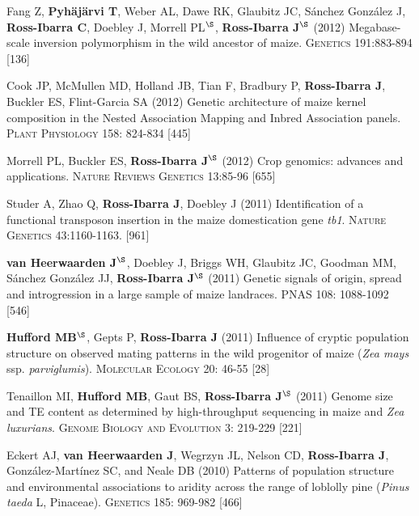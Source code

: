 \documentclass[letterpaper,10pt]{article}
\begin{document}
\begin{etaremune}
\item Fang Z, {\bf Pyh\"aj\"arvi T}, Weber AL, Dawe RK, Glaubitz JC, S\'{a}nchez Gonz\'{a}lez J, {\bf Ross-Ibarra C}, Doebley J, Morrell PL$^\S$, {\bf Ross-Ibarra J}$^\S$  (2012) Megabase-scale inversion polymorphism in the wild ancestor of maize. \textsc{Genetics} 191:883-894
{} [136]\\


\item Cook JP, McMullen MD, Holland JB, Tian F, Bradbury P, {\bf Ross-Ibarra J}, Buckler ES, Flint-Garcia SA (2012) Genetic architecture of maize kernel composition in the Nested Association Mapping and Inbred Association panels. \textsc{Plant Physiology} 158: 824-834
{} [445]\\

\item Morrell PL, Buckler ES, {\bf Ross-Ibarra J}$^\S$ (2012) Crop genomics: advances and applications.  \textsc{Nature Reviews Genetics} 13:85-96 %
{} [655]\\


\item Studer A, Zhao Q, {\bf Ross-Ibarra J}, Doebley J (2011) Identification of a functional transposon insertion in the maize domestication gene \emph{tb1}.  \textsc{Nature Genetics} 43:1160-1163.
{} [961]\\


\item {\bf van Heerwaarden J}$^\S$, Doebley J, Briggs WH, Glaubitz JC, Goodman MM, S\'{a}nchez Gonz\'{a}lez JJ, {\bf Ross-Ibarra J}$^\S$ (2011) Genetic signals of origin, spread and introgression in a large sample of maize landraces. PNAS 108: 1088-1092
{} [546]\\


\item {\bf Hufford MB}$^\S$, Gepts P, {\bf Ross-Ibarra J} (2011) Influence of cryptic population structure on observed mating patterns in the wild progenitor of maize (\emph{Zea mays} ssp. \emph{parviglumis}).  \textsc{Molecular Ecology} 20: 46-55
{} [28]\\


\item Tenaillon MI, {\bf Hufford MB}, Gaut BS, {\bf Ross-Ibarra J}$^\S$ (2011)  Genome size and TE content as determined by high-throughput sequencing in maize and \emph{Zea luxurians}.  \textsc{Genome Biology and Evolution } 3: 219-229
{} [221]\\


\item Eckert AJ, {\bf van Heerwaarden J}, Wegrzyn JL, Nelson CD, {\bf Ross-Ibarra J}, Gonz\'{a}lez-Mart\'{i}nez SC, and Neale DB (2010) Patterns of population structure and environmental associations to aridity across the range of loblolly pine (\emph{Pinus taeda} L, Pinaceae).  \textsc{Genetics} 185: 969-982
{} [466]\\



\end{etaremune}
\end{document}
